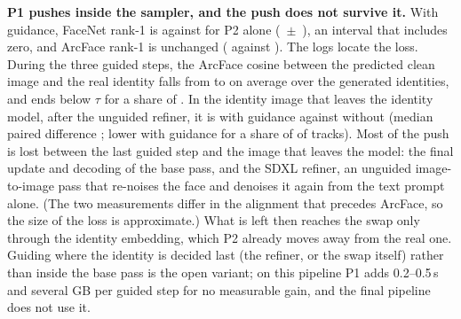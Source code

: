 \begin{table}[ht]\centering
\caption{P1: diffusion guidance on top of P2 ($\beta = 1.2$), against P2 alone.}
\label{tab:e3-p1}

\end{table}

\begin{table}[ht]\centering
\caption{P3: CIAGAN identity-code optimization at two hinge thresholds, against plain CIAGAN.}
\label{tab:e3-p3}

\end{table}

\textbf{P1 pushes inside the sampler, and the push does not survive it.} With
guidance, FaceNet rank-1 is 
against  for P2 alone
(~$\pm$~),
an interval that includes zero, and ArcFace rank-1 is unchanged
( against
). The logs locate the loss. During the three
guided steps, the ArcFace cosine between the predicted clean image and the real
identity falls from  to
 on average over the
 generated identities, and ends
below $\tau$ for a share of .
In the identity image that leaves the identity model, after the unguided
refiner, it is  with guidance against
 without (median paired difference
; lower with guidance for
a share of  of
 tracks).
Most of the push is lost between the last guided step and the image that
leaves the model: the final update and decoding of the base pass, and the SDXL
refiner, an unguided image-to-image pass that re-noises the face and denoises
it again from the text prompt alone. (The two measurements differ in the
alignment that precedes ArcFace, so the size of the loss is approximate.) What
is left then reaches the swap only through the identity embedding, which P2
already moves away from the real one. Guiding where the identity is decided
last (the refiner, or the swap itself) rather than inside the base pass is the
open variant; on this pipeline P1 adds 0.2--0.5\,s and several GB per guided
step for no measurable gain, and the final pipeline does not use it.

